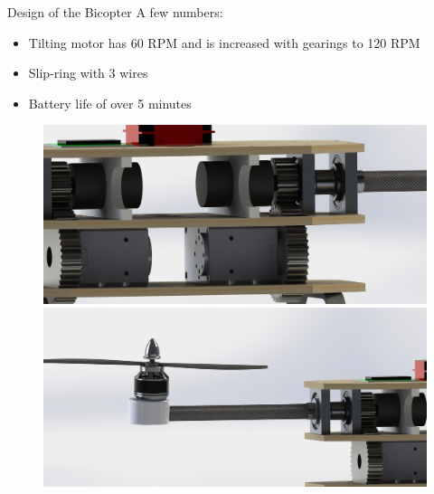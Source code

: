 \documentclass{beamer}
\begin{document}
\begin{frame}{Design of the Bicopter}
A few numbers:
\begin{itemize}
\item Tilting motor has 60 RPM and is increased with gearings to 120 RPM
\item Slip-ring with 3 wires
\item Battery life of over 5 minutes
\end{itemize}
\begin{figure}
\includegraphics[scale=0.04]{pictures/zoom1}
\includegraphics[scale=0.04]{pictures/zoom2}
\end{figure}
\end{frame}
\end{document}
